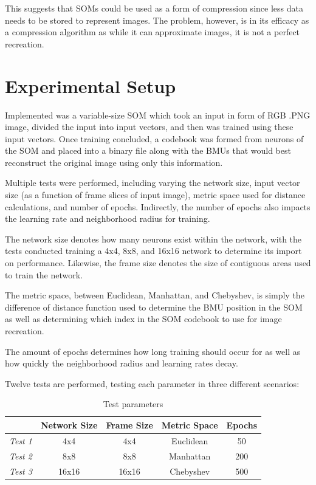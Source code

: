 \documentclass[a4paper,12pt]{article}
\begin{document}
This suggests that SOMs could be used as a form of compression since less data needs to be stored to represent images. The problem, however, is in its efficacy as a compression algorithm as while it can approximate images, it is not a perfect recreation.

\section{Experimental Setup}

Implemented was a variable-size SOM which took an input in form of RGB .PNG image, divided the input into input vectors, and then was trained using these input vectors. Once training concluded, a codebook was formed from neurons of the SOM and placed into a binary file along with the BMUs that would best reconstruct the original image using only this information.

Multiple tests were performed, including varying the network size, input vector size (as a function of frame slices of input image), metric space used for distance calculations, and number of epochs. Indirectly, the number of epochs also impacts the learning rate and neighborhood radius for training.

The network size denotes how many neurons exist within the network, with the tests conducted training a 4x4, 8x8, and 16x16 network to determine its import on performance. Likewise, the frame size denotes the size of contiguous areas used to train the network.

The metric space, between Euclidean, Manhattan, and Chebyshev, is simply the difference of distance function used to determine the BMU position in the SOM as well as determining which index in the SOM codebook to use for image recreation.

The amount of epochs determines how long training should occur for as well as how quickly the neighborhood radius and learning rates decay.

\pagebreak

Twelve tests are performed, testing each parameter in three different scenarios:

\begin{table}[h!]
\centering
\begin{tabular}{c|c|c|c|c|}
\cline{2-5}
\multicolumn{1}{l|}{} & \textbf{Network Size} & \textbf{Frame Size} & \textbf{Metric Space} & \textbf{Epochs} \\ \hline
\multicolumn{1}{|c|}{\textit{Test 1}} & 4x4 & 4x4 & Euclidean & 50 \\ \hline
\multicolumn{1}{|c|}{\textit{Test 2}} & 8x8 & 8x8 & Manhattan & 200 \\ \hline
\multicolumn{1}{|c|}{\textit{Test 3}} & 16x16 & 16x16 & Chebyshev & 500 \\ \hline
\end{tabular}
\caption{Test parameters}
\end{table}
\end{document}
